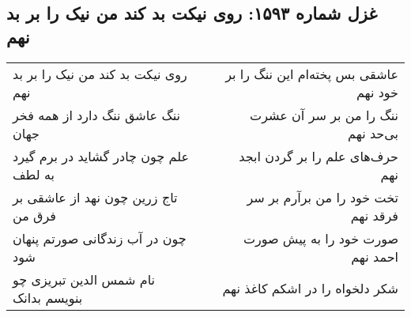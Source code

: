 \begin{center}
\section*{غزل شماره ۱۵۹۳: روی نیکت بد کند من نیک را بر بد نهم}
\label{sec:1593}
\begin{longtable}{l p{0.5cm} r}
روی نیکت بد کند من نیک را بر بد نهم
&&
عاشقی بس پخته‌ام این ننگ را بر خود نهم
\\
ننگ عاشق ننگ دارد از همه فخر جهان
&&
ننگ را من بر سر آن عشرت بی‌حد نهم
\\
علم چون چادر گشاید در برم گیرد به لطف
&&
حرف‌های علم را بر گردن ابجد نهم
\\
تاج زرین چون نهد از عاشقی بر فرق من
&&
تخت خود را من برآرم بر سر فرقد نهم
\\
چون در آب زندگانی صورتم پنهان شود
&&
صورت خود را به پیش صورت احمد نهم
\\
نام شمس الدین تبریزی چو بنویسم بدانک
&&
شکر دلخواه را در اشکم کاغذ نهم
\\
\end{longtable}
\end{center}
